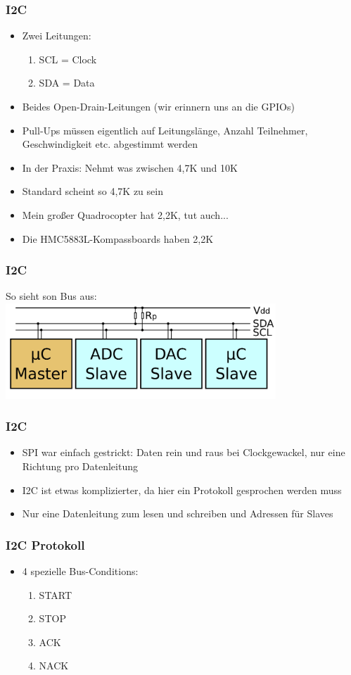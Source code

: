 \documentclass[ngerman,compress]{beamer}
\begin{document}
\begin{frame}
	\frametitle{I2C}
	\begin{itemize}
		\item Zwei Leitungen:
		\begin{enumerate}
			\item SCL = Clock
			\item SDA = Data
		\end{enumerate}
		\item Beides Open-Drain-Leitungen (wir erinnern uns an die GPIOs)
		\item Pull-Ups müssen eigentlich auf Leitungslänge, Anzahl Teilnehmer, Geschwindigkeit etc. abgestimmt werden
		\item In der Praxis: Nehmt was zwischen 4,7K und 10K
		\item Standard scheint so 4,7K zu sein
		\item Mein großer Quadrocopter hat 2,2K, tut auch...
		\item Die HMC5883L-Kompassboards haben 2,2K
	\end{itemize}
\end{frame}

\begin{frame}
	\frametitle{I2C}
	So sieht son Bus aus:
	\includegraphics[width=4in]{I2C.png}
\end{frame}

\begin{frame}
	\frametitle{I2C}
	\begin{itemize}
		\item SPI war einfach gestrickt: Daten rein und raus bei Clockgewackel, nur eine Richtung pro Datenleitung
		\item I2C ist etwas komplizierter, da hier ein Protokoll gesprochen werden muss
		\item Nur eine Datenleitung zum lesen und schreiben und Adressen für Slaves
	\end{itemize}
\end{frame}

\begin{frame}
	\frametitle{I2C Protokoll}
	\begin{itemize}
		\item 4 spezielle Bus-Conditions:
		\begin{enumerate}
			\item START
			\item STOP
			\item ACK
			\item NACK
		\end{enumerate}
	\end{itemize}
\end{frame}
\end{document}
